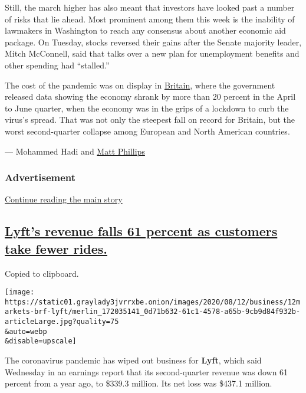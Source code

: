 Still, the march higher has also meant that investors have looked past a
number of risks that lie ahead. Most prominent among them this week is
the inability of lawmakers in Washington to reach any consensus about
another economic aid package. On Tuesday, stocks reversed their gains
after the Senate majority leader, Mitch McConnell, said that talks over
a new plan for unemployment benefits and other spending had ``stalled.''

The cost of the pandemic was on display in
\href{https://www.nytimes3xbfgragh.onion/live/2020/08/12/business/stock-market-today-coronavirus/britains-lockdown-recession-is-the-deepest-in-europe-and-north-america}{Britain},
where the government released data showing the economy shrank by more
than 20 percent in the April to June quarter, when the economy was in
the grips of a lockdown to curb the virus's spread. That was not only
the steepest fall on record for Britain, but the worst second-quarter
collapse among European and North American countries.

--- Mohammed Hadi and
\href{https://www.nytimes3xbfgragh.onion/by/matt-phillips}{Matt
Phillips}

\hypertarget{advertisement}{%
\subsubsection{Advertisement}\label{advertisement}}

\protect\hyperlink{after-dfp-ad-mid1}{Continue reading the main story}

\hypertarget{lyfts-revenue-falls-61-percent-as-customers-take-fewer-rides}{%
\subsection{\texorpdfstring{\protect\hyperlink{lyfts-revenue-falls-61-percent-as-customers-take-fewer-rides}{Lyft's
revenue falls 61 percent as customers take fewer
rides.}}{Lyft's revenue falls 61 percent as customers take fewer rides.}}\label{lyfts-revenue-falls-61-percent-as-customers-take-fewer-rides}}

Copied to clipboard.

\texttt{[image: https://static01.graylady3jvrrxbe.onion/images/2020/08/12/business/12markets-brf-lyft/merlin\_172035141\_0d71b632-61c1-4578-a65b-9cb9d84f932b-articleLarge.jpg?quality=75\\\&auto=webp\\\&disable=upscale]}

The coronavirus pandemic has wiped out business for \textbf{Lyft}, which
said Wednesday in an earnings report that its second-quarter revenue was
down 61 percent from a year ago, to \$339.3 million. Its net loss was
\$437.1 million.

